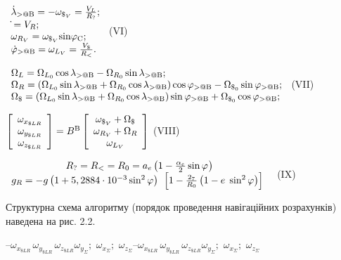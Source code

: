 $\begin{array}{l} {\dot{\lambda }_{{\rm >@B}} =-\omega_{\$_{V} } =\frac{V_{L} }{R_{{
\rm ?}} } ;} \\ {\dot{}=V_{R} ;} \\ {\omega_{R_{V}} =\omega_{\$_{V} } {\rm sin}
\varphi_{{\rm C}} ;} \\ {\dot{\varphi }_{{\rm >@B}} =\omega_{L_{V} } =\frac{V_{
\$ } }{R_{{\rm <}} } .} \end{array}$                                                      (VI) 



$\begin{array}{l} 
{\Omega_{L} =\Omega_{L_{0} } \cos \lambda_{{\rm >@B}} -\Omega_{R_{0} } \sin \lambda 
_{{\rm >@B}} ;} \\ {\Omega_{R} =(\Omega_{L_{0} } \sin \lambda_{{\rm >@B}} +\Omega 
_{R_{0} } \cos \lambda_{{\rm >@B}} )\cos \varphi_{{\rm >@B}} -\Omega_{\$_{0} 
} \sin \varphi_{{\rm >@B}} ;} \\ {\Omega_{\$ } =(\Omega_{L_{0} } \sin \lambda 
_{{\rm >@B}} +\Omega_{R_{0} } \cos \lambda_{{\rm >@B}} )\sin \varphi_{{\rm >@B}} 
+\Omega_{\$_{0} } \cos \varphi_{{\rm >@B}} ;} \end{array}$       (VII) 



$\left[\begin{array}{c} {\omega_{x_{\$ LR} } } \\ {\omega_{y_{\$ LR} } } \\ {\omega 
_{z_{\$ LR} } } \end{array}\right]=B^{{\rm B}} \left[\begin{array}{c} {\omega_{
\$_{V} } +\Omega_{\$ } } \\ {\omega_{R_{V} } +\Omega_{R} } \\ {\omega_{L_{V} 
} } \end{array}\right]$                                             (VIII)



$\begin{array}{c} {R_{{\rm ?}} =R_{{\rm <}} =R_{0} =a_{e} \left(1-\frac{\alpha_{e} 
}{2} \sin {\rm \varphi }_{} \right)} \\ {g_{R} =-g\left(1+5,2884\cdot 10^{-3} \sin 
^{2} \varphi \right){\rm \; }\left[1-\frac{2_{{\rm 7}} }{R_{0} } \left(1-e{\rm \; 
}\sin ^{2} \varphi \right)\right]{\rm \; }} \end{array}$                    (IX)



Структурна 
схема алгоритму (порядок проведення навігаційних розрахунків) наведена на рис. 2.2.

\eject \textbf{}

--$\omega 
_{x_{\$ LR} } \, \omega_{y_{\$ LR} } \, \omega_{z_{\$ LR} } $$\omega_{y_{\Sigma 
} } ;\, \, \omega_{x_{\Sigma } } ;\, \, \omega_{z_{\Sigma } } $--$\omega_{x_{
\$ LR} } \, \omega_{y_{\$ LR} } \, \omega_{z_{\$ LR} } $$\omega_{y_{\Sigma } } 
;\, \, \omega_{x_{\Sigma } } ;\, \, \omega_{z_{\Sigma } } $


